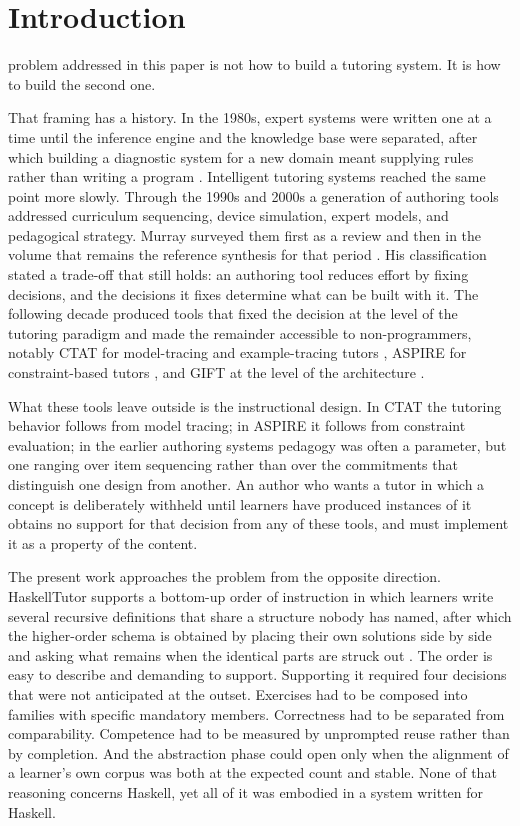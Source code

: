 \documentclass[journal]{IEEEtran}
\begin{document}
\section{Introduction}\label{sec:1}
 problem addressed in this paper is not how to build a tutoring
system. It is how to build the second one.

That framing has a history. In the 1980s, expert systems were written
one at a time until the inference engine and the knowledge base were
separated, after which building a diagnostic system for a new domain
meant supplying rules rather than writing a program \cite{b1}. Intelligent
tutoring systems reached the same point more slowly. Through the 1990s
and 2000s a generation of authoring tools addressed curriculum
sequencing, device simulation, expert models, and pedagogical strategy.
Murray surveyed them first as a review \cite{b2} and then in the volume
that remains the reference synthesis for that period \cite{b3}. His
classification stated a trade-off that still holds: an authoring tool
reduces effort by fixing decisions, and the decisions it fixes determine
what can be built with it. The following decade produced tools that
fixed the decision at the level of the tutoring paradigm and made the
remainder accessible to non-programmers, notably CTAT for model-tracing
and example-tracing tutors \cite{b4}, ASPIRE for constraint-based tutors
\cite{b5}, and GIFT at the level of the architecture \cite{b6}.

What these tools leave outside is the instructional design. In CTAT the
tutoring behavior follows from model tracing; in ASPIRE it follows from
constraint evaluation; in the earlier authoring systems pedagogy was
often a parameter, but one ranging over item sequencing rather than over
the commitments that distinguish one design from another. An author who
wants a tutor in which a concept is deliberately withheld until learners
have produced instances of it obtains no support for that decision from
any of these tools, and must implement it as a property of the content.

The present work approaches the problem from the opposite direction.
HaskellTutor supports a bottom-up order of instruction in which learners
write several recursive definitions that share a structure nobody has
named, after which the higher-order schema is obtained by placing their
own solutions side by side and asking what remains when the identical
parts are struck out \cite{b7}. The order is easy to describe and
demanding to support. Supporting it required four decisions that were
not anticipated at the outset. Exercises had to be composed into
families with specific mandatory members. Correctness had to be
separated from comparability. Competence had to be measured by
unprompted reuse rather than by completion. And the abstraction phase
could open only when the alignment of a learner's own corpus was both at
the expected count and stable. None of that reasoning concerns Haskell,
yet all of it was embodied in a system written for Haskell.
\end{document}
